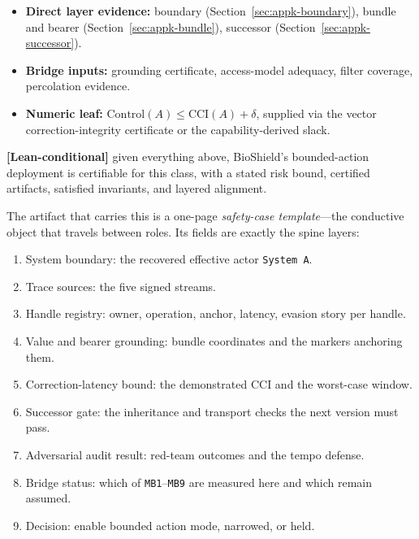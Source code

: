 \begin{refsection}
\begin{itemize}[nosep]
  \item \textbf{Direct layer evidence:} boundary (Section~\ref{sec:appk-boundary}), bundle and bearer (Section~\ref{sec:appk-bundle}), successor (Section~\ref{sec:appk-successor}).
  \item \textbf{Bridge inputs:} grounding certificate, access-model adequacy, filter coverage, percolation evidence.
  \item \textbf{Numeric leaf:} $\mathrm{Control}(A)\le\mathrm{CCI}(A)+\delta$, supplied via the vector correction-integrity certificate or the capability-derived slack.
\end{itemize}

\textbf{[Lean-conditional]} given everything above, BioShield's bounded-action deployment is certifiable for this class, with a stated risk bound, certified artifacts, satisfied invariants, and layered alignment.

The artifact that carries this is a one-page \emph{safety-case template}---the conductive object that travels between roles. Its fields are exactly the spine layers:

\begin{enumerate}[nosep]
  \item System boundary: the recovered effective actor \texttt{System A}.
  \item Trace sources: the five signed streams.
  \item Handle registry: owner, operation, anchor, latency, evasion story per handle.
  \item Value and bearer grounding: bundle coordinates and the markers anchoring them.
  \item Correction-latency bound: the demonstrated $\mathrm{CCI}$ and the worst-case window.
  \item Successor gate: the inheritance and transport checks the next version must pass.
  \item Adversarial audit result: red-team outcomes and the tempo defense.
  \item Bridge status: which of \texttt{MB1}--\texttt{MB9} are measured here and which remain assumed.
  \item Decision: enable bounded action mode, narrowed, or held.
\end{enumerate}


\end{refsection}

